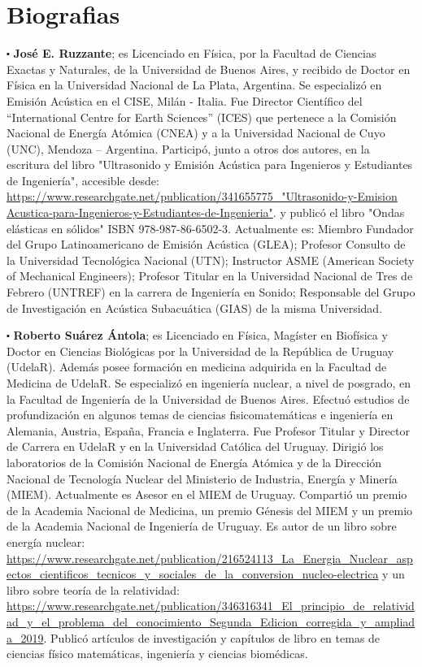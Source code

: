 \documentclass[
11pt, %
spanish,
singlespacing, %
parskip, %
headsepline, %
]{MastersDoctoralThesis} %
\begin{document}
\vspace{10mm}




\chapter*{Biografias}

\begin{sloppypar}


$\centerdot$ \textbf{José E. Ruzzante}; es Licenciado en Física, por la Facultad de Ciencias Exactas y Naturales, de la Universidad de Buenos Aires, y recibido de Doctor en Física en la Universidad Nacional de La Plata, Argentina. Se especializó en Emisión Acústica en el CISE, Milán - Italia. Fue Director Científico del “International Centre for Earth Sciences” (ICES) que pertenece a la Comisión Nacional de Energía Atómica (CNEA) y a la Universidad Nacional de Cuyo (UNC), Mendoza – Argentina. Participó, junto a otros dos autores, en la escritura del libro "Ultrasonido y Emisión Acústica para Ingenieros y Estudiantes de Ingeniería", accesible desde: \url{https://www.researchgate.net/publication/341655775_"Ultrasonido-y-Emision Acustica-para-Ingenieros-y-Estudiantes-de-Ingenieria"}. y publicó el libro "Ondas elásticas en sólidos" ISBN 978-987-86-6502-3.
 Actualmente es:  Miembro Fundador del Grupo Latinoamericano de Emisión Acústica (GLEA);  Profesor Consulto de la Universidad Tecnológica Nacional (UTN);  Instructor ASME (American Society of Mechanical Engineers); Profesor Titular en la Universidad Nacional de Tres de Febrero (UNTREF) en la carrera de Ingeniería en Sonido;  Responsable del Grupo de Investigación en Acústica Subacuática (GIAS) de la misma Universidad.
 
$\centerdot$ \textbf{Roberto Suárez Ántola}; es Licenciado en Física, Magíster en Biofísica y Doctor en Ciencias Biológicas por la Universidad de la República de Uruguay (UdelaR).  Además posee formación en medicina adquirida en la Facultad de Medicina de UdelaR. Se especializó en ingeniería nuclear, a nivel de posgrado, en la Facultad de Ingeniería de la Universidad de Buenos Aires. Efectuó estudios de profundización en algunos temas de ciencias fisicomatemáticas e ingeniería en Alemania, Austria, España, Francia e Inglaterra.
Fue Profesor Titular y Director de Carrera en UdelaR y en la Universidad Católica del Uruguay. Dirigió los laboratorios de la Comisión Nacional de Energía Atómica y de la Dirección Nacional de Tecnología Nuclear del Ministerio de Industria, Energía y Minería (MIEM). Actualmente es Asesor en el MIEM de Uruguay. Compartió un premio de la Academia Nacional de Medicina, un premio Génesis del MIEM y un premio de la Academia Nacional de Ingeniería de Uruguay. Es autor de un libro sobre energía nuclear: \url{https://www.researchgate.net/publication/216524113_La_Energia_Nuclear_aspectos_cientificos_tecnicos_y_sociales_de_la_conversion_nucleo-electrica} y un libro sobre teoría de la relatividad: \url{https://www.researchgate.net/publication/346316341_El_principio_de_relatividad_y_el_problema_del_conocimiento_Segunda_Edicion_corregida_y_ampliada_2019}. Publicó artículos de investigación y capítulos de libro en temas de ciencias físico matemáticas, ingeniería y ciencias biomédicas.


\end{sloppypar}
\end{document}
